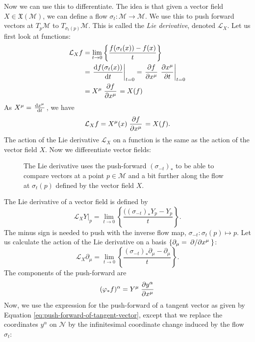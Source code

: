 Now we can use this to differentiate. The idea is that given a vector field $X \in \mathfrak{X}(\mathcal{M})$, we can define a flow $\sigma_t\colon \mathcal{M} \to \mathcal{M}$. We use this to push forward vectors at $T_p \mathcal{M}$ to $T_{\sigma_t (p)} \mathcal{M}$.
This is called the \emph{Lie derivative}, denoted $\mathcal{L}_X$.
Let us first look at functions:
\begin{align}
  \mathcal{L}_X f &= \lim_{t \to 0} \left\{ \frac{f(\sigma_t(x)) - f(x)}{t} \right\} \\
		  &= \left.\dv{f(\sigma_t(x))}{t}\right\rvert_{t=0} = \left.\pdv{f}{x^\mu}\right. \left.\pdv{x^\mu}{t}\right\rvert_{t=0} \\
		  &= X^\mu \left.\pdv{f}{x^\mu}\right. = X(f)
\end{align}
As $X^\mu = \left.\dv{x^\mu}{t}\right.$, we have
\begin{equation}
  \mathcal{L}_X f = X^\mu(x) \left.\pdv{f}{x^\mu}\right. = X(f).
\end{equation}
The action of the Lie derivative $\mathcal{L}_X$ on a function is the same as the action of the vector field $X$.
Now we differentiate vector fields:
\begin{figure}[htpb]
  \centering
  \def\svgwidth{0.85\columnwidth}
  
  \caption{The Lie derivative uses the push-forward $(\sigma_{-t})_*$ to be able to compare vectors at a point $p \in \mathcal{M}$ and a bit further along the flow at $\sigma_t(p)$ defined by the vector field $X$.}
  \label{fig:liediffvf}
\end{figure}
The Lie derivative of a vector field is defined by
\begin{equation}
  \left.\mathcal{L}_X Y\right\rvert_p = \lim_{t\to 0} \left\{ \frac{((\sigma_{-t})_*Y_p - Y_p}{t} \right\}.
\end{equation}
The minus sign is needed to push with the inverse flow map, $\sigma_{-t}\colon \sigma_t(p) \mapsto p$.
Let us calculate the action of the Lie derivative on a basis $\{ \partial_\mu = \left.\pdv*{}{x^\mu}\right. \}$:
\begin{equation}
  \mathcal{L}_X \partial_\mu = \lim_{t \to 0} \left\{ \frac{(\sigma_{-t})_* \partial_\mu - \partial_\mu}{t} \right\}.
\end{equation}
The components of the push-forward are
\begin{equation}
  (\varphi_* f)^\alpha = Y^\mu \left.\pdv{y^\alpha}{x^\mu}\right.
\end{equation}
Now, we use the expression for the push-forward of a tangent vector as given by Equation \eqref{eq:push-forward-of-tangent-vector}, except that we replace the coordinates $y^\alpha$ on $\mathcal{N}$ by the infinitesimal coordinate change induced by the flow $\sigma_t$:
